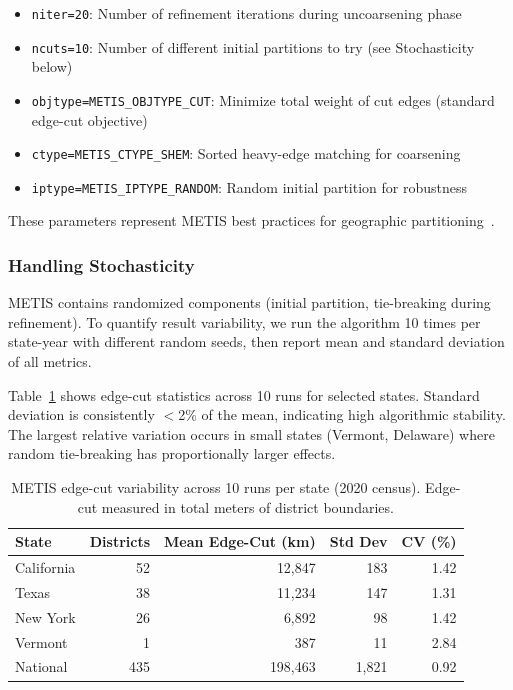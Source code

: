 \begin{itemize}
    \item \texttt{niter=20}: Number of refinement iterations during uncoarsening phase
    \item \texttt{ncuts=10}: Number of different initial partitions to try (see Stochasticity below)
    \item \texttt{objtype=METIS\_OBJTYPE\_CUT}: Minimize total weight of cut edges (standard edge-cut objective)
    \item \texttt{ctype=METIS\_CTYPE\_SHEM}: Sorted heavy-edge matching for coarsening
    \item \texttt{iptype=METIS\_IPTYPE\_RANDOM}: Random initial partition for robustness
\end{itemize}

These parameters represent METIS best practices for geographic partitioning~\cite{karypis1999}.

\subsubsection{Handling Stochasticity}

METIS contains randomized components (initial partition, tie-breaking during refinement). To quantify result variability, we run the algorithm 10 times per state-year with different random seeds, then report mean and standard deviation of all metrics.

Table~\ref{tab:metis-variance} shows edge-cut statistics across 10 runs for selected states. Standard deviation is consistently $<$2\% of the mean, indicating high algorithmic stability. The largest relative variation occurs in small states (Vermont, Delaware) where random tie-breaking has proportionally larger effects.

\begin{table}[t]
\centering
\caption{METIS edge-cut variability across 10 runs per state (2020 census). Edge-cut measured in total meters of district boundaries.}
\label{tab:metis-variance}
\begin{tabular}{lrrrr}
\toprule
State & Districts & Mean Edge-Cut (km) & Std Dev & CV (\%) \\
\midrule
California & 52 & 12,847 & 183 & 1.42 \\
Texas & 38 & 11,234 & 147 & 1.31 \\
New York & 26 & 6,892 & 98 & 1.42 \\
Vermont & 1 & 387 & 11 & 2.84 \\
National & 435 & 198,463 & 1,821 & 0.92 \\
\bottomrule
\end{tabular}
\end{table}

